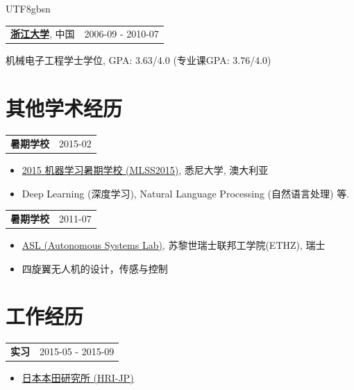 \documentclass[margin,line]{res}
\newenvironment{list1}{
  \begin{list}{\ding{113}}{%
      \setlength{\itemsep}{0in}
      \setlength{\parsep}{0in} \setlength{\parskip}{0in}
      \setlength{\topsep}{0in} \setlength{\partopsep}{0in} 
      \setlength{\leftmargin}{0.17in}}}{\end{list}}
\begin{document}
\begin{CJK*}{UTF8}{gbsn}
\begin{resume}
\begin{tabularx}{\textwidth}{X r}
\href{http://www.zju.edu.cn/english/}{{\bf 浙江大学}}, 中国   &2006-09 - 2010-07\\
\end{tabularx}
\vspace*{-.1in}
\begin{list1}
\item[] 机械电子工程学士学位, GPA: 3.63/4.0 (专业课GPA: 3.76/4.0)
\end{list1}

\section{\sc 其他学术经历}

\begin{tabularx}{\textwidth}{X r}
{\bf 暑期学校} & 2015-02\\
\end{tabularx}
\begin{itemize}
\item[] \href{http://rp-www.cs.usyd.edu.au/~mlss/}{2015 机器学习暑期学校 (MLSS2015)}, 悉尼大学, 澳大利亚

\vspace*{-2.5mm}
\item[] Deep Learning (深度学习), Natural Language Processing (自然语言处理) 等.
\end{itemize}

\begin{tabularx}{\textwidth}{X r}
{\bf 暑期学校} & 2011-07\\
\end{tabularx}
\begin{itemize}
\item[] \href{http://www.asl.ethz.ch}{ASL (Autonomous Systems Lab)}, 苏黎世瑞士联邦工学院(ETHZ), 瑞士

\vspace*{-2.5mm}
\item[] 四旋翼无人机的设计，传感与控制
\end{itemize}

\section{\sc 工作经历}

\begin{tabularx}{\textwidth}{X r}
{\bf 实习} & 2015-05 - 2015-09\\
\end{tabularx}
\begin{itemize}
\item[] \href{http://www.jp.honda-ri.com/english}{日本本田研究所 (HRI-JP)}


\end{itemize}
\end{resume}
\end{CJK*}
\end{document}
